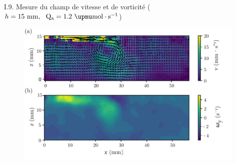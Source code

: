 \documentclass[aspectratio=169,10pt]{beamer}
\begin{document}
\begin{frame}{I.9. Mesure du champ de vitesse et de vorticité ($h=15~\rm mm,~~Q_{\rm a} = 1.2~\rm \upmu mol\cdot s^{-1}$)}
    \begin{figure}[t]
        \centering
        \includegraphics[scale=.8]{./figures/rolling_vortex_velocity_vorticity_v2.pdf}
    \end{figure}
\end{frame}


\end{document}
